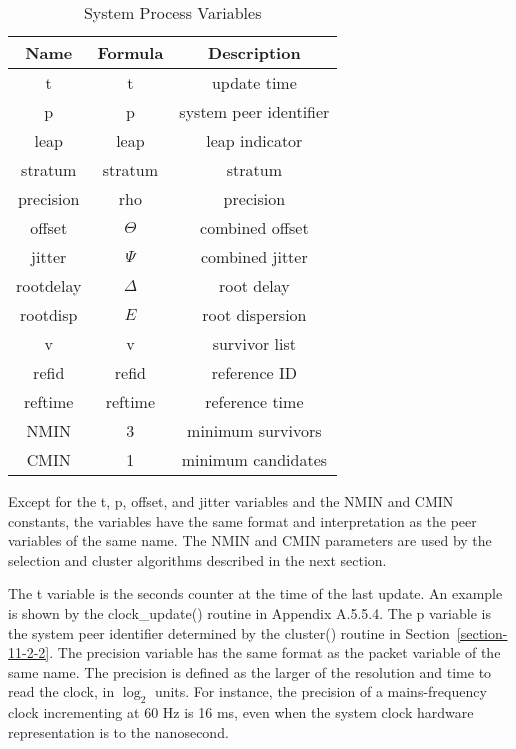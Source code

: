 \begin{table}[htb]
\center
\begin{tabular}{c | c | c}
Name & Formula & Description \\
\hline
\hline
t         & t          & update time            \\
p         & p          & system peer identifier \\
leap      & leap       & leap indicator         \\
stratum   & stratum    & stratum                \\
precision & rho        & precision              \\
offset    & $ \Theta $      & combined offset        \\
jitter    & $ \Psi $        & combined jitter        \\
rootdelay & $ \Delta $      & root delay             \\
rootdisp  & $ E $    & root dispersion        \\
v         & v          & survivor list          \\
refid     & refid      & reference ID           \\
reftime   & reftime    & reference time         \\
NMIN      & 3          & minimum survivors      \\
CMIN      & 1          & minimum candidates     \\
\hline
\end{tabular}
\label{system_process_variables}
\caption{System Process Variables}
\end{table}

Except for the t, p, offset, and jitter variables and the NMIN and
CMIN constants, the variables have the same format and interpretation
as the peer variables of the same name.  The NMIN and CMIN parameters
are used by the selection and cluster algorithms described in the
next section.

The t variable is the seconds counter at the time of the last update.
An example is shown by the clock\_update() routine in
Appendix A.5.5.4.  The p variable is the system peer identifier
determined by the cluster() routine in Section~\ref{section-11-2-2}.  The precision
variable has the same format as the packet variable of the same name.
The precision is defined as the larger of the resolution and time to
read the clock, in $ \log_2 $ units.  For instance, the precision of a
mains-frequency clock incrementing at 60 Hz is 16 ms, even when the
system clock hardware representation is to the nanosecond.

